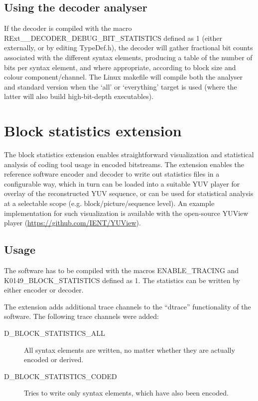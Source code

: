 \documentclass[a4paper,11pt]{jvetdoc}
\begin{document}
\subsection{Using the decoder analyser}
If the decoder is compiled with the macro RExt__DECODER_DEBUG_BIT_STATISTICS defined as 1 (either externally, or by editing TypeDef.h), the decoder will gather fractional bit counts associated with the different syntax elements, producing a table of the number of bits per syntax element, and where appropriate, according to block size and colour component/channel.
The Linux makefile will compile both the analyser and standard version when the `all' or `everything' target is used (where the latter will also build  high-bit-depth executables).



\section{Block statistics extension}
\label{sec:block-stat-extens}

The block statistics extension enables straightforward visualization and statistical analysis of coding tool
usage in encoded bitstreams. The extension enables the reference
software encoder and decoder to write out statistics files in a configurable
way, which in turn can be loaded into a suitable YUV player for overlay of the
reconstructed YUV sequence, or can be used for statistical analysis at a
selectable scope (e.g. block/picture/sequence level). An example implementation
for such visualization is available with the open-source YUView player
(\url{https://github.com/IENT/YUView}). 


\subsection{Usage}
\label{sec:usage}

The software has to be compiled with the macros ENABLE_TRACING and
K0149_BLOCK_STATISTICS  defined as 1. The statistics can be written by either
encoder or decoder.

The extension adds additional trace channels to the ``dtrace'' functionality of
the software. The following trace channels were added:
\begin{description}
\item[D_BLOCK_STATISTICS_ALL] All syntax elements are written, no matter whether
  they are actually encoded or derived.
\item[D_BLOCK_STATISTICS_CODED] Tries to write only syntax elements, which have
  also been encoded.
\end{description}
\end{document}
